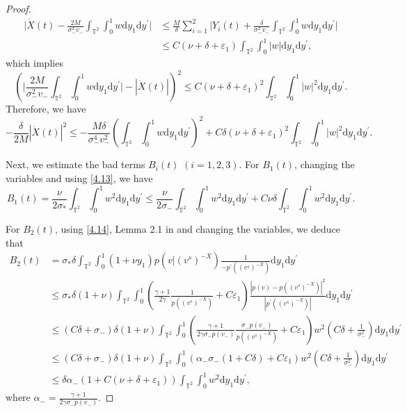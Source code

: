 \documentclass[10pt,reqno]{amsart}
\numberwithin{equation}{section}
\newcommand{\dif}{\mathrm{d}}
\begin{document}
\begin{proof}
\begin{align*}
\Big|\dot{X}(t)-\frac{2M}{\sigma_-^2v_-}\int_{\mathbb{T}^2}\int_0^1w\dif y_1\dif y^{\prime}\Big|
&\le \frac{M}{\delta}\sum\limits_{i=1}^2
\Big|Y_i(t)+\frac{\delta}{\sigma_-^2v_-}\int_{\mathbb{T}^2}\int_0^1w\dif y_1\dif y^{\prime}\Big|\\
&\le C(\nu+\delta+\varepsilon_1)\int_{\mathbb{T}^2}\int_0^1|w|\dif y_1\dif y^{\prime},
\end{align*}
which implies
\[
\left(\Big|\frac{2M}{\sigma_-^2v_-}\int_{\mathbb{T}^2}\int_0^1w\dif y_1\dif y^{\prime}\Big|-|\dot{X}(t)|\right)^2
\le C(\nu+\delta+\varepsilon_1)^2\int_{\mathbb{T}^2}\int_0^1|w|^2\dif y_1\dif y^{\prime}.
\]
Therefore, we have
\begin{equation}\label{x1}
-\frac{\delta}{2M}|\dot{X}(t)|^2\le -\frac{M\delta}{\sigma_-^4v_-^2}
\left(\int_{\mathbb{T}^2}\int_0^1w\dif y_1\dif y^{\prime}\right)^2
+C\delta(\nu+\delta+\varepsilon_1)^2\int_{\mathbb{T}^2}\int_0^1|w|^2\dif y_1\dif y^{\prime}.
\end{equation}

Next, we estimate the bad terms $B_i(t)$ $(i=1,2,3)$. For $B_1(t)$, changing the variables and using \eqref{4.13}, we have
\[
B_1(t)=\frac{\nu}{2\sigma_\ast}\int_{\mathbb{T}^2}\int_0^1w^2\dif y_1\dif y^{\prime}
\le \frac{\nu}{2\sigma_-}\int_{\mathbb{T}^2}\int_0^1w^2\dif y_1\dif y^{\prime}
+C\nu\delta\int_{\mathbb{T}^2}\int_0^1w^2\dif y_1\dif y^{\prime}.
\]

For $B_2(t)$, using \eqref{4.14}, Lemma 2.1 in \cite{WY} and changing the variables, we deduce that
\begin{equation}\label{b2}
\begin{aligned}
B_2(t)&=\sigma_\ast\delta\int_{\mathbb{T}^2}\int_0^1
(1+\nu y_1)p(v|(v^s)^{-X})\frac{1}{-p^{\prime}((v^s)^{-X})}\dif y_1\dif y^{\prime}\\
&\le\sigma_\ast\delta(1+\nu)\int_{\mathbb{T}^2}\int_0^1
\left(\frac{\gamma+1}{2\gamma}\frac{1}{p((v^s)^{-X})}+C\varepsilon_1\right)
\frac{|p(v)-p((v^s)^{-X})|^2}{|p^{\prime}((v^s)^{-X})|}\dif y_1\dif y^{\prime}\\
&\le (C\delta+\sigma_-)\delta(1+\nu)\int_{\mathbb{T}^2}\int_0^1
\left(\frac{\gamma+1}{2\gamma\sigma_-p(v_-)}\frac{\sigma_-p(v_-)}{p((v^s)^{-X})}+C\varepsilon_1\right)
w^2\left(C\delta+\frac{1}{\sigma_-^2}\right)\dif y_1\dif y^{\prime}\\
&\le (C\delta+\sigma_-)\delta(1+\nu)\int_{\mathbb{T}^2}\int_0^1
\left(\alpha_-\sigma_-(1+C\delta)+C\varepsilon_1\right)
w^2\left(C\delta+\frac{1}{\sigma_-^2}\right)\dif y_1\dif y^{\prime}\\
&\le \delta\alpha_-(1+C(\nu+\delta+\varepsilon_1))\int_{\mathbb{T}^2}\int_0^1
w^2\dif y_1\dif y^{\prime},
\end{aligned}
\end{equation}
where $\alpha_-=\frac{\gamma+1}{2\gamma\sigma_-p(v_-)}$.


\end{proof}
\end{document}
